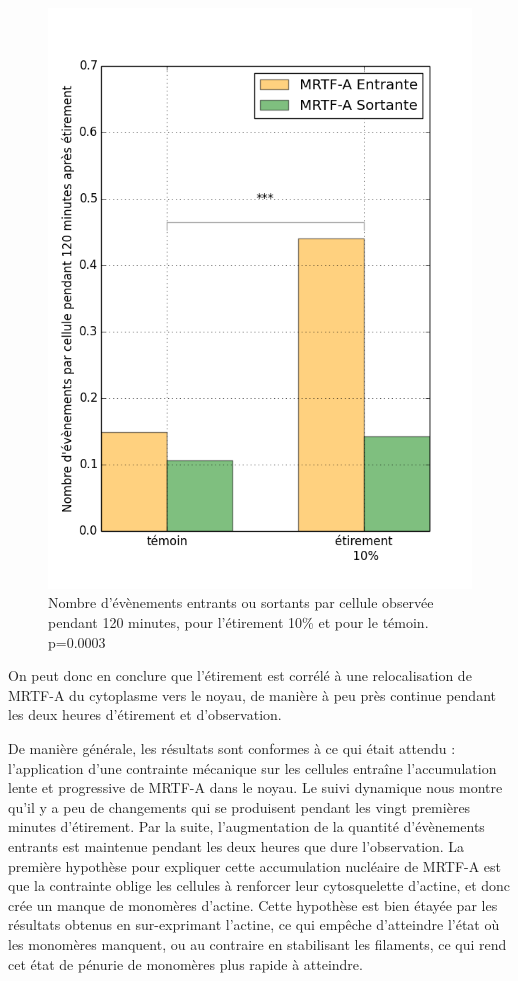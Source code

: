 \begin{figure}
\includegraphics[scale=0.4]{Figures/Etirement10_vs_temoin_activite.png} 
\caption{\label{activite_Et10} Nombre d'évènements entrants ou sortants par cellule observée pendant 120 minutes, pour l'étirement 10\% et pour le témoin. p=0.0003 }
\end{figure}

On peut donc en conclure que l'étirement est corrélé à une relocalisation de MRTF-A du cytoplasme vers le noyau, de manière à peu près continue pendant les deux heures d'étirement et d'observation. 

De manière générale, les résultats sont conformes à ce qui était attendu : l'application d'une contrainte mécanique sur les cellules entraîne l'accumulation lente et progressive de MRTF-A dans le noyau. 
Le suivi dynamique nous montre qu'il y a peu de changements qui se produisent pendant les vingt premières minutes d'étirement. Par la suite, l'augmentation de la quantité d'évènements entrants est maintenue pendant les deux heures que dure l'observation. 
La première hypothèse pour expliquer cette accumulation nucléaire de MRTF-A est que la contrainte oblige les cellules à renforcer leur cytosquelette d'actine, et donc crée un manque de monomères d'actine. Cette hypothèse est bien étayée par les résultats obtenus en sur-exprimant l'actine, ce qui empêche d'atteindre l'état où les monomères manquent, ou au contraire en stabilisant les filaments, ce qui rend cet état de pénurie de monomères plus rapide à atteindre.


